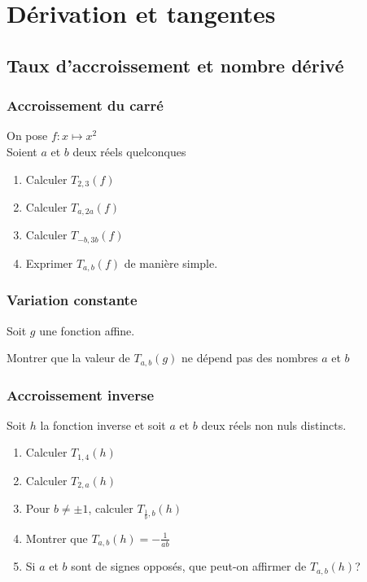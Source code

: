 \documentclass[oneside,12pt]{book}          %
\begin{document}
\chapter{Dérivation et tangentes}
\newpage

\section{Taux d'accroissement et nombre dérivé}

\subsection{Accroissement du carré}
On pose $f: x \mapsto x^2$\\
Soient $a$ et $b$ deux réels quelconques
\begin{enumerate}
    \item Calculer $T_{2,3}(f)$
    \item Calculer $T_{a,2a}(f)$
    \item Calculer $T_{-b,3b}(f)$
    \item Exprimer $T_{a,b}(f)$ de manière simple.
\end{enumerate}


\subsection{Variation constante}
Soit $g$ une fonction affine.

Montrer que la valeur de $T_{a,b}(g)$ ne dépend pas des nombres $a$ et $b$


\subsection{Accroissement inverse}
Soit $h$ la fonction inverse et soit $a$ et $b$ deux réels non nuls distincts.
\begin{enumerate}
    \item Calculer $T_{1,4}(h)$
    \item Calculer $T_{2,a}(h)$
    \item Pour $b \neq \pm 1$, calculer $T_{\frac{1}{b},b}(h)$
    \item Montrer que $T_{a,b}(h) = -\frac{1}{ab}$
    \item Si $a$ et $b$ sont de signes opposés, que peut-on affirmer de $T_{a,b}(h)$?
\end{enumerate}
\end{document}
